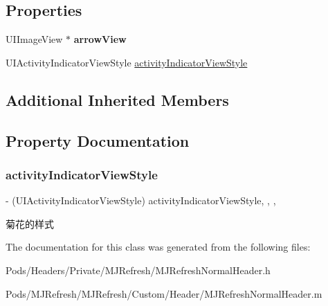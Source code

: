 \subsection*{Properties}
\begin{DoxyCompactItemize}
\item 
\mbox{\label{interface_m_j_refresh_normal_header_ac3867e93424a3da52e0564e4346e4cf2}} 
U\+I\+Image\+View $\ast$ {\bfseries arrow\+View}
\item 
U\+I\+Activity\+Indicator\+View\+Style \mbox{\hyperlink{interface_m_j_refresh_normal_header_af2405f2c247543419290f9fa63c5a42c}{activity\+Indicator\+View\+Style}}
\end{DoxyCompactItemize}
\subsection*{Additional Inherited Members}


\subsection{Property Documentation}
\mbox{\label{interface_m_j_refresh_normal_header_af2405f2c247543419290f9fa63c5a42c}} 
\subsubsection{\texorpdfstring{activity\+Indicator\+View\+Style}{activityIndicatorViewStyle}}
{\footnotesize\ttfamily -\/ (U\+I\+Activity\+Indicator\+View\+Style) activity\+Indicator\+View\+Style\hspace{0.3cm}{\ttfamily [read]}, {\ttfamily [write]}, {\ttfamily [nonatomic]}, {\ttfamily [assign]}}

菊花的样式 

The documentation for this class was generated from the following files\+:\begin{DoxyCompactItemize}
\item 
Pods/\+Headers/\+Private/\+M\+J\+Refresh/M\+J\+Refresh\+Normal\+Header.\+h\item 
Pods/\+M\+J\+Refresh/\+M\+J\+Refresh/\+Custom/\+Header/M\+J\+Refresh\+Normal\+Header.\+m\end{DoxyCompactItemize}

